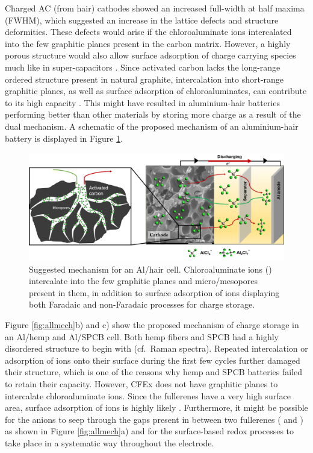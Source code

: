 \documentclass{article}
\begin{document}
Charged AC (from hair) cathodes showed an increased full-width at half maxima (FWHM), which suggested an increase in the lattice defects and structure deformities. These defects would arise if the chloroaluminate ions intercalated into the few graphitic planes present in the carbon matrix. However, a highly porous structure would also allow surface adsorption of charge carrying species much like in super-capacitors \cite{beguin_carbons_2014}. Since activated carbon lacks the long-range ordered structure present in natural graphite, intercalation into short-range graphitic planes, as well as surface adsorption of chloroaluminates, can contribute to its high capacity \cite{brezesinski_ordered_2010}. This might have resulted in aluminium-hair batteries performing better than other materials by storing more charge as a result of the dual mechanism. A schematic of the proposed mechanism of an aluminium-hair battery is displayed in Figure \ref{fig:ACHmech}.

 \begin{figure}%
  \centering
  \includegraphics[width=\textwidth]{fig/ACHmech}
    \caption{Suggested mechanism for an Al/hair cell. Chloroaluminate ions () intercalate into the few graphitic planes and micro/mesopores present in them, in addition to surface adsorption of ions displaying both Faradaic and non-Faradaic processes for charge storage.}
  \label{fig:ACHmech}
\end{figure}


Figure \ref{fig:allmech}b) and c) show the proposed mechanism of charge storage in an Al/hemp and Al/SPCB cell. Both hemp fibers and SPCB had a highly disordered structure to begin with (cf.\ Raman spectra). Repeated intercalation or adsorption of ions onto their surface during the first few cycles further damaged their structure, which is one of the reasons why hemp and SPCB batteries failed to retain their capacity. However, CFEx does not have graphitic planes to intercalate chloroaluminate ions. Since the fullerenes have a very high surface area, surface adsorption of ions is highly likely \cite{adams_van_1994}. Furthermore, it might be possible for the anions to seep through the gaps present in between two fullerenes ( and ) as shown in Figure \ref{fig:allmech}a) and for the surface-based redox processes to take place in a systematic way throughout the electrode.
\end{document}
